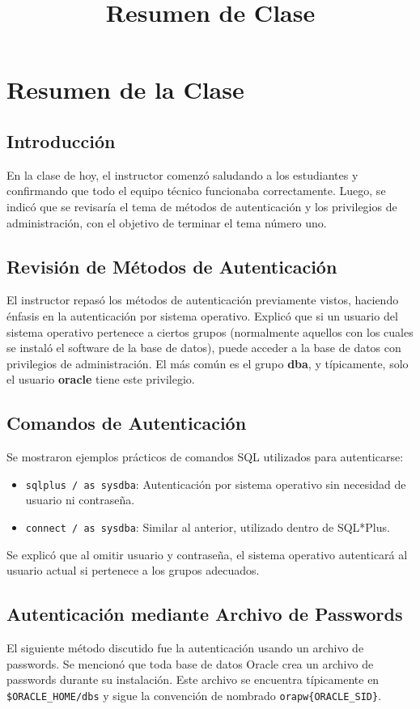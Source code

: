 \documentclass[12pt]{article}
\title{Resumen de Clase}
\author{}
\date{}
\begin{document}
\maketitle

\section*{Resumen de la Clase}

\subsection*{Introducción}
En la clase de hoy, el instructor comenzó saludando a los estudiantes y confirmando que todo el equipo técnico funcionaba correctamente. Luego, se indicó que se revisaría el tema de métodos de autenticación y los privilegios de administración, con el objetivo de terminar el tema número uno.

\subsection*{Revisión de Métodos de Autenticación}
El instructor repasó los métodos de autenticación previamente vistos, haciendo énfasis en la autenticación por sistema operativo. Explicó que si un usuario del sistema operativo pertenece a ciertos grupos (normalmente aquellos con los cuales se instaló el software de la base de datos), puede acceder a la base de datos con privilegios de administración. El más común es el grupo \textbf{dba}, y típicamente, solo el usuario \textbf{oracle} tiene este privilegio.

\subsection*{Comandos de Autenticación}
Se mostraron ejemplos prácticos de comandos SQL utilizados para autenticarse:
\begin{itemize}
    \item \texttt{sqlplus / as sysdba}: Autenticación por sistema operativo sin necesidad de usuario ni contraseña.
    \item \texttt{connect / as sysdba}: Similar al anterior, utilizado dentro de SQL*Plus.
\end{itemize}
Se explicó que al omitir usuario y contraseña, el sistema operativo autenticará al usuario actual si pertenece a los grupos adecuados.

\subsection*{Autenticación mediante Archivo de Passwords}
El siguiente método discutido fue la autenticación usando un archivo de passwords. Se mencionó que toda base de datos Oracle crea un archivo de passwords durante su instalación. Este archivo se encuentra típicamente en \texttt{\$ORACLE\_HOME/dbs} y sigue la convención de nombrado \texttt{orapw\{ORACLE\_SID\}}.
\end{document}
